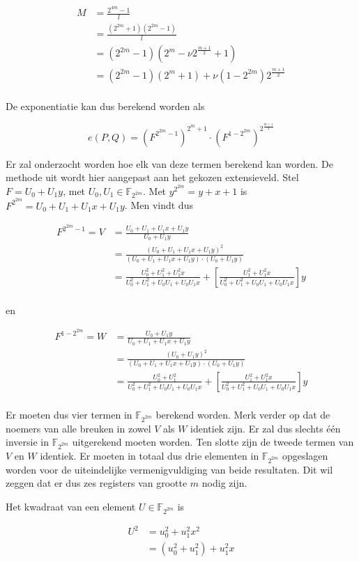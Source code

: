 \[\begin{aligned}
M	&= \frac{2^{4m} - 1}{l}\\
	&= \frac{(2^{2m} + 1)(2^{2m} - 1)}{l}\\
	&= (2^{2m} - 1)(2^m - \nu 2^{\frac{m + 1}{2}} + 1)\\
	&= (2^{2m} - 1)(2^m + 1) + \nu(1 - 2^{2m})2^{\frac{m + 1}{2}}\\
\end{aligned}\]

De exponentiatie kan dus berekend worden als

\[e(P, Q) = \left(F^{2^{2m} - 1}\right)^{2^m + 1} \cdot \left(F^{1 - 2^{2m}}\right)^{2^{\frac{m + 1}{2}}}\]

Er zal onderzocht worden hoe elk van deze termen berekend kan worden. De methode uit \cite{beuchat} wordt hier aangepast aan het gekozen extensieveld. Stel $F = U_0 + U_1y$, met $U_0, U_1 \in \mathbb{F}_{2^{2m}}$. Met $y^{2^{2m}} = y + x + 1$ is $F^{2^{2m}} = U_0 + U_1 + U_1x + U_1y$. Men vindt dus 

\[\begin{aligned}
F^{2^{2m} - 1} = V &= \frac{U_0 + U_1 + U_1x + U_1y}{U_0 + U_1y}\\
	&= \frac{(U_0 + U_1 + U_1x + U_1y)^2}{(U_0 + U_1 + U_1x + U_1y) \cdot (U_0 + U_1y)}\\
	&= \frac{U_0^2 + U_1^2 + U_1^2x}{U_0^2 + U_1^2 + U_0 U_1 + U_0 U_1 x} + \left[\frac{U_1^2 + U_1^2x}{U_0^2 + U_1^2 + U_0 U_1 + U_0 U_1 x}\right]y\\
\end{aligned}\]

en

\[\begin{aligned}
F^{1 - 2^{2m}}	= W &= \frac{U_0 + U_1y}{U_0 + U_1 + U_1x + U_1y}\\
	&= \frac{(U_0 + U_1y)^2}{(U_0 + U_1 + U_1x + U_1y) \cdot (U_0 + U_1y)}\\
	&= \frac{U_0^2 + U_1^2}{U_0^2 + U_1^2 + U_0 U_1 + U_0 U_1 x} + \left[\frac{U_1^2 + U_1^2x}{U_0^2 + U_1^2 + U_0 U_1 + U_0 U_1 x}\right]y\\
\end{aligned}\]

Er moeten dus vier termen in $\mathbb{F}_{2^{2m}}$ berekend worden. Merk verder op dat de noemers van alle breuken in zowel $V$ als $W$ identiek zijn. Er zal dus slechts \'e\'en inversie in $\mathbb{F}_{2^{2m}}$ uitgerekend moeten worden. Ten slotte zijn de tweede termen van $V$ en $W$ identiek. Er moeten in totaal dus drie elementen in $\mathbb{F}_{2^{2m}}$ opgeslagen worden voor de uiteindelijke vermenigvuldiging van beide resultaten. Dit wil zeggen dat er dus zes registers van grootte $m$ nodig zijn.

Het kwadraat van een element $U \in \mathbb{F}_{2^{2m}}$ is

\[\begin{aligned}
U^2	&= u_0^2 + u_1^2 x^2\\
		&= (u_0^2 + u_1^2) + u_1^2 x\\
\end{aligned}\]


